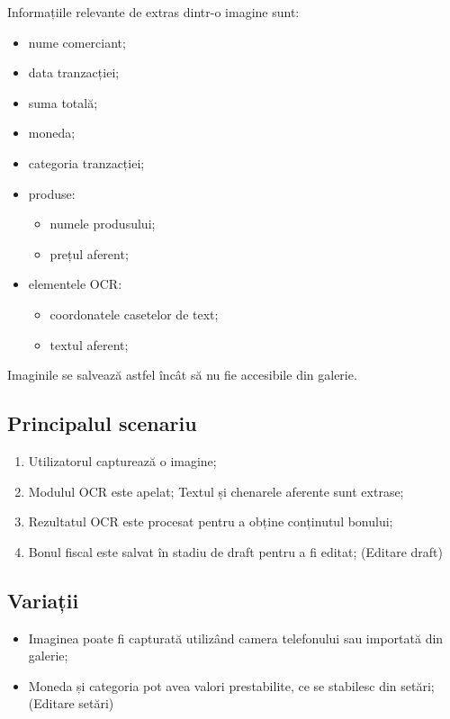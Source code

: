 Informațiile relevante de extras dintr-o imagine sunt:
\begin{multicols}{3}
\begin{itemize}
\item
  nume comerciant;
\item
  data tranzacției;
\item
  suma totală;
\item
  moneda;
\item
  categoria tranzacției;
\item
  produse:
  \begin{itemize}
  \item
    numele produsului;
  \item
    prețul aferent;
  \end{itemize}
\item
  elementele OCR:
  \begin{itemize}
  \item
    coordonatele casetelor de text;
  \item
    textul aferent;
  \end{itemize}
\end{itemize}
\end{multicols}

Imaginile se salvează astfel încât să nu fie accesibile din galerie.

\subsection*{Principalul scenariu}\label{principalul-scenariu}

\begin{enumerate}
\item
  Utilizatorul capturează o imagine;
\item
  Modulul OCR este apelat; Textul și chenarele aferente sunt extrase;
\item
  Rezultatul OCR este procesat pentru a obține conținutul bonului;
\item
  Bonul fiscal este salvat în stadiu de draft pentru a fi editat;
  (Editare draft)
\end{enumerate}

\subsection*{Variații}\label{variaux21bii}

\begin{itemize}
\item
  Imaginea poate fi capturată utilizând camera telefonului sau importată
  din galerie;
\item
  Moneda și categoria pot avea valori prestabilite, ce se stabilesc din
  setări; (Editare setări)
\end{itemize}


